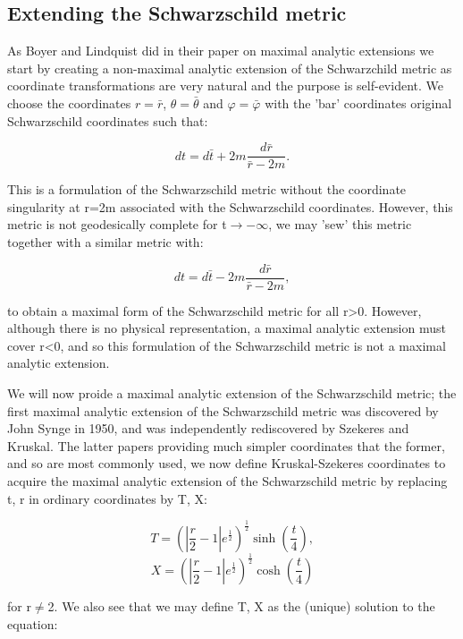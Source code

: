 \documentclass[oneside,openright,frontopenright, singlespacing]{dmathesis}
\begin{document}
\subsection{Extending the Schwarzschild metric}\label{subsec:Subsection6.1.1}

\vspace{1em}
	As Boyer and Lindquist did in their paper on maximal analytic extensions\cite{boyer1967maximal} we start by creating a non-maximal analytic extension of the Schwarzchild metric as coordinate transformations are very natural and the purpose is self-evident. We choose the coordinates $r=\bar{r}$, $\theta=\bar{\theta}$ and $\varphi=\bar{\varphi}$ with the 'bar' coordinates original Schwarzschild coordinates such that:

	\[dt = d\bar{t}+2m\frac{d\bar{r}}{\bar{r}-2m}.\]

\vspace{1em}
	This is a formulation of the Schwarzschild metric without the coordinate singularity at r=2m associated with the Schwarzschild coordinates. However, this metric is not geodesically complete for t$\rightarrow-\infty$, we may 'sew' this metric together with a similar metric with:

	\[dt = d\bar{t}-2m\frac{d\bar{r}}{\bar{r}-2m},\]

	to obtain a maximal form of the Schwarzschild metric for all r>0. However, although there is no physical representation, a maximal analytic extension must cover r<0, and so this formulation of the Schwarzschild metric is not a maximal analytic extension.

\vspace{1em}
	We will now proide a maximal analytic extension of the Schwarzschild metric; the first maximal analytic extension of the Schwarzschild metric was discovered by John Synge in 1950\cite{synge1950gravitational}, and was independently rediscovered by Szekeres\cite{szekeres1960singularities} and Kruskal\cite{kruskal1960maximal}. The latter papers providing much simpler coordinates that the former, and so are most commonly used, we now define Kruskal-Szekeres coordinates to acquire the maximal analytic extension of the Schwarzschild metric by replacing t, r in ordinary coordinates by T, X:

	\[T=(|\frac{r}{2}-1|e^{\frac{1}{2}})^{\frac{1}{2}}\sinh\left(\frac{t}{4}\right),\]
	\[X=(|\frac{r}{2}-1|e^{\frac{1}{2}})^{\frac{1}{2}}\cosh\left(\frac{t}{4}\right)\]

\vspace{1em}
	for r$\neq$2. We also see that we may define T, X as the (unique) solution to the equation:
\end{document}

